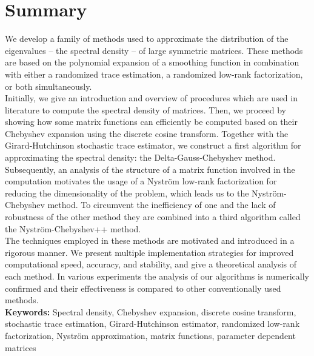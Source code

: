 \chapter*{Summary}
\label{chp:0-summary}

We develop a family of methods used to approximate the distribution of the eigenvalues -- the spectral density --
of large symmetric matrices. These methods are based on the polynomial expansion
of a smoothing function in combination with either a randomized trace estimation,
a randomized low-rank factorization, or both simultaneously.\\

Initially, we give an introduction and overview of procedures which are used in literature
to compute the spectral density of matrices. Then, we proceed by showing how
some matrix functions can efficiently be computed based on
their Chebyshev expansion using the discrete cosine transform.
Together with the Girard-Hutchinson stochastic trace estimator, we construct a first
algorithm for approximating the spectral density: the Delta-Gauss-Chebyshev method.
Subsequently, an analysis of the structure of a matrix function involved in the computation
motivates the usage of a Nystr\"om low-rank factorization for reducing the
dimensionality of the problem, which leads us to the Nystr\"om-Chebyshev method.
To circumvent the inefficiency of one and the lack of robustness of the other
method they are combined into a third algorithm called the
Nystr\"om-Chebyshev++ method.\\

The techniques employed in these methods are motivated and introduced in a
rigorous manner. We present multiple implementation strategies for improved
computational speed, accuracy, and stability, and give a theoretical analysis
of each method. In various experiments the analysis of our algorithms is
numerically confirmed and their effectiveness is compared to other
conventionally used methods.\\

\textbf{Keywords:} Spectral density, Chebyshev expansion, discrete cosine transform, stochastic trace estimation,
Girard-Hutchinson estimator, randomized low-rank factorization, Nystr\"om approximation,
matrix functions, parameter dependent matrices
